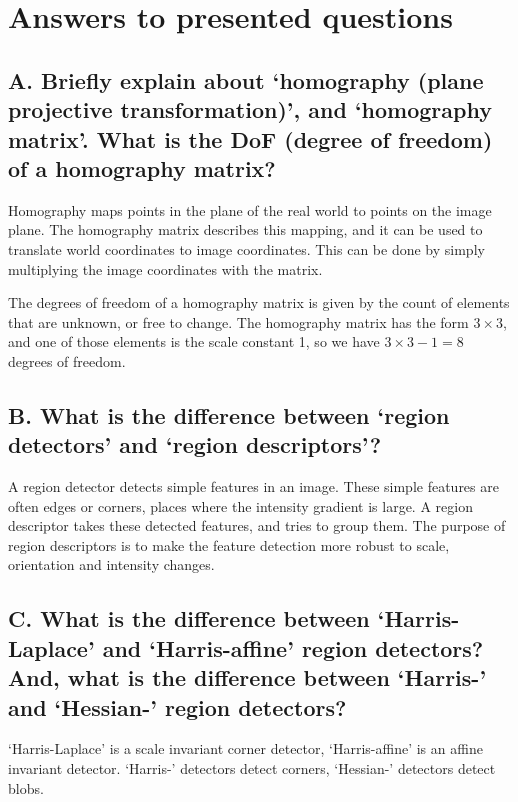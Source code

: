 \setcounter{secnumdepth}{0}

\section{Answers to presented questions}

\subsection{A. Briefly explain about ‘homography (plane projective
transformation)’, and ‘homography matrix’.  What is the DoF (degree of freedom)
of a homography matrix?}

Homography maps points in the plane of the real world to points on the image
plane. The homography matrix describes this mapping, and it can be used to
translate world coordinates to image coordinates. This can be done by simply
multiplying the image coordinates with the matrix.

The degrees of freedom of a homography matrix is given by the count of elements
that are unknown, or free to change. The homography matrix has the form
\(3\times3\), and one of those elements is the scale constant 1, so we have
\(3\times3-1=8\) degrees of freedom.

\subsection{B. What is the difference between ‘region detectors’ and ‘region
descriptors’?}

A region detector detects simple features in an image. These simple features
are often edges or corners, places where the intensity gradient is large.
A region descriptor takes these detected features, and tries to group them. The
purpose of region descriptors is to make the feature detection more robust to
scale, orientation and intensity changes.

\subsection{C. What is the difference between ‘Harris-Laplace’ and
‘Harris-affine’ region detectors? And, what is the difference between ‘Harris-’
and ‘Hessian-’ region detectors?}
`Harris-Laplace' is a scale invariant corner detector, `Harris-affine' is
an affine invariant detector.
`Harris-' detectors detect corners, `Hessian-' detectors detect blobs.

